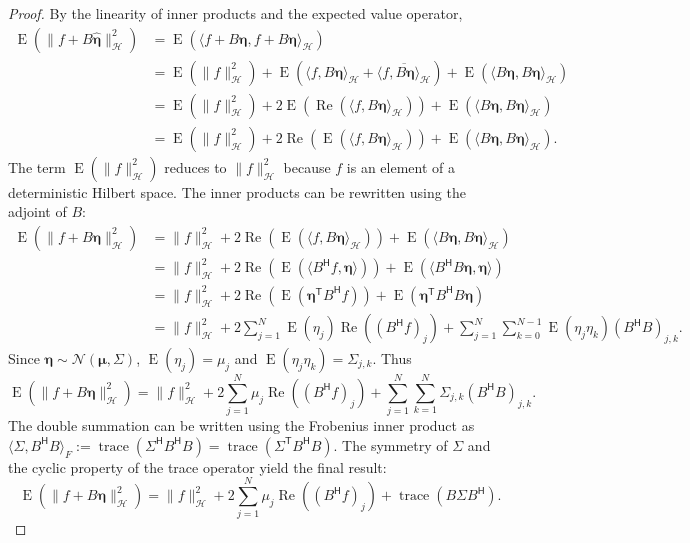\documentclass[12pt]{article}
\newcommand{\trans}[1]{{#1}^\mathsf{T}}	%
\newcommand{\ctrans}[1]{{#1}^\mathsf{H}}	%
\DeclareMathOperator{\trace}{trace}		%
\newcommand{\dft}[1]{\widehat{#1}}	%
\newcommand{\noise}{\eta}	%
\newcommand{\noiseVec}{\bm{\noise}}	%
\DeclareMathOperator{\E}{E}	%
\renewcommand{\Re}{\operatorname{Re}}	%
\begin{document}
\begin{proof}
By the linearity of inner products and the expected value operator,
\begin{align*}
\E(\|f + B\dft{\noiseVec}\|_{\mathcal{H}}^2) &= \E(\langle f + B\noiseVec, f + B\noiseVec\rangle_{\mathcal{H}}) \\
&= \E(\|f\|_{\mathcal{H}}^2) + \E\left(\langle f, B\noiseVec\rangle_{\mathcal{H}} + \overline{\langle f, B\noiseVec\rangle_{\mathcal{H}}}\right) + \E(\langle B\noiseVec, B\noiseVec\rangle_{\mathcal{H}}) \\
&= \E(\|f\|_{\mathcal{H}}^2) + 2\E\left(\Re(\langle f, B\noiseVec\rangle_{\mathcal{H}})\right) + \E(\langle B\noiseVec, B\noiseVec\rangle_{\mathcal{H}}) \\
&= \E(\|f\|_{\mathcal{H}}^2) + 2\Re\left(\E(\langle f, B\noiseVec\rangle_{\mathcal{H}})\right) + \E(\langle B\noiseVec, B\noiseVec\rangle_{\mathcal{H}}).
\end{align*}
The term $\E(\|f\|_{\mathcal{H}}^2)$ reduces to $\|f\|_{\mathcal{H}}^2$ because $f$ is an element of a deterministic Hilbert space. The inner products can be rewritten using the adjoint of $B$:
\begin{align*}
\E(\|f + B\noiseVec\|_{\mathcal{H}}^2) &= \|f\|_{\mathcal{H}}^2 + 2\Re\left(\E(\langle f, B\noiseVec\rangle_{\mathcal{H}})\right) + \E(\langle B\noiseVec, B\noiseVec\rangle_{\mathcal{H}}) \\
&= \|f\|_{\mathcal{H}}^2 + 2\Re\left(\E(\langle \ctrans{B}f, \noiseVec\rangle)\right) + \E(\langle \ctrans{B}B\noiseVec,\noiseVec\rangle) \\
&= \|f\|_{\mathcal{H}}^2 + 2\Re\left(\E(\trans{\noiseVec}\ctrans{B}f)\right) + \E(\trans{\noiseVec}{\ctrans{B}}B\noiseVec) \\
&= \|f\|_{\mathcal{H}}^2 + 2\sum_{j=1}^{N} \E(\noise_j)\Re((\ctrans{B}f)_j) + \sum_{j=1}^{N}\sum_{k=0}^{N-1} \E(\noise_j\noise_k)(\ctrans{B}B)_{j,k}.
\end{align*}
Since $\noiseVec \sim \mathcal{N}(\bm{\mu},\Sigma)$, $\E(\noise_j) = \mu_j$ and $\E(\noise_j\noise_k) = \Sigma_{j,k}$. Thus
\[\E(\|f + B\noiseVec\|_{\mathcal{H}}^2) = \|f\|_{\mathcal{H}}^2 + 2\sum_{j=1}^{N} \mu_j\Re((\ctrans{B}f)_j) + \sum_{j=1}^{N}\sum_{k=1}^{N} \Sigma_{j,k}(\ctrans{B}B)_{j,k}.\]
The double summation can be written using the Frobenius inner product as $\langle \Sigma, \ctrans{B}B\rangle_F := \trace(\ctrans{\Sigma}\ctrans{B}B) = \trace(\trans{\Sigma}\ctrans{B}B)$. The symmetry of $\Sigma$ and the cyclic property of the trace operator yield the final result:
\[\E(\|f + B\noiseVec\|_{\mathcal{H}}^2) = \|f\|_{\mathcal{H}}^2 + 2\sum_{j=1}^{N} \mu_j\Re((\ctrans{B}f)_j) + \trace(B\Sigma\ctrans{B}).\]
\end{proof}
\end{document}
